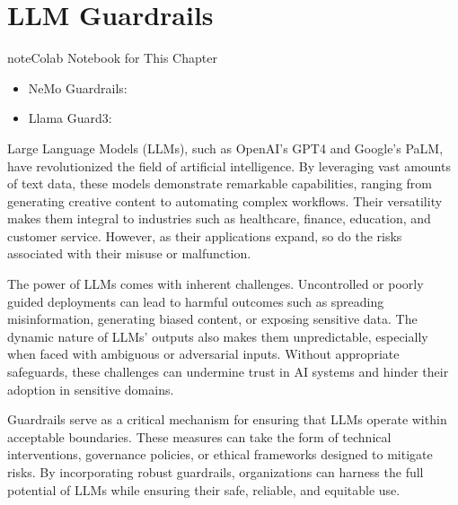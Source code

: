\documentclass[letterpaper,11pt,english]{sphinxmanual}
\begin{document}
\sphinxstepscope


\chapter{LLM Guardrails}
\label{\detokenize{guardrails:llm-guardrails}}\label{\detokenize{guardrails:guardrails}}\label{\detokenize{guardrails::doc}}
\begin{sphinxadmonition}{note}{Colab Notebook for This Chapter}
\begin{itemize}
\item {} 
\sphinxAtStartPar
NeMo Guardrails: 

\item {} 
\sphinxAtStartPar
Llama Guard3: 

\end{itemize}
\end{sphinxadmonition}

\sphinxAtStartPar
Large Language Models (LLMs), such as OpenAI’s GPT\sphinxhyphen{}4 and Google’s PaLM,
have revolutionized the field of artificial intelligence. By leveraging
vast amounts of text data, these models demonstrate remarkable
capabilities, ranging from generating creative content to automating
complex workflows. Their versatility makes them integral to industries
such as healthcare, finance, education, and customer service. However,
as their applications expand, so do the risks associated with their
misuse or malfunction.

\sphinxAtStartPar
The power of LLMs comes with inherent challenges. Uncontrolled or poorly
guided deployments can lead to harmful outcomes such as spreading
misinformation, generating biased content, or exposing sensitive data.
The dynamic nature of LLMs’ outputs also makes them unpredictable,
especially when faced with ambiguous or adversarial inputs. Without
appropriate safeguards, these challenges can undermine trust in AI
systems and hinder their adoption in sensitive domains.

\sphinxAtStartPar
Guardrails serve as a critical mechanism for ensuring that LLMs operate
within acceptable boundaries. These measures can take the form of
technical interventions, governance policies, or ethical frameworks
designed to mitigate risks. By incorporating robust guardrails,
organizations can harness the full potential of LLMs while ensuring
their safe, reliable, and equitable use.
\end{document}

